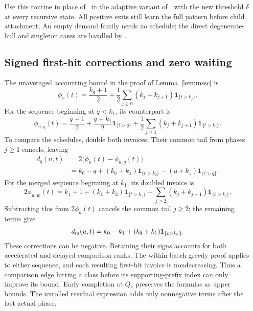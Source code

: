 Use this routine in place of \BatchOrders\ in the adaptive variant
of \ExpectedTree, with the new threshold $\delta$ at every recursive
state. All positive exits still learn the full pattern before child
attachment. An empty demand family needs no schedule; the direct
degenerate-hull and singleton cases are handled by \ExpectedTree.

\subsection{Signed first-hit corrections and zero waiting}

The unaveraged accounting bound in the proof of
Lemma~\ref{lem:mssc} is
\[
 \phi_u(t)=\frac{k_0+1}{2}
  +\frac12\sum_{j\ge0}(k_j+k_{j+1})\mathbf1_{\{t>k_j\}}.
\]
For the sequence beginning at $q<k_1$, its counterpart is
\[
 \phi_{u,q}(t)=\frac{q+1}{2}
  +\frac{q+k_1}{2}\mathbf1_{\{t>q\}}
  +\frac12\sum_{j\ge1}(k_j+k_{j+1})\mathbf1_{\{t>k_j\}}.
\]
To compare the schedules, double both invoices. Their common tail
from phases $j\ge1$ cancels, leaving
\begin{equation}\label{eq:first-phase-correction}
 \begin{aligned}
 d_q(u,t)&=2\bigl(\phi_u(t)-\phi_{u,q}(t)\bigr)\\
 &=k_0-q+(k_0+k_1)\mathbf1_{\{t>k_0\}}
              -(q+k_1)\mathbf1_{\{t>q\}}.
 \end{aligned}
\end{equation}
For the merged sequence beginning at $k_1$, its doubled invoice is
\[
 2\phi_{u,\mathrm m}(t)=k_1+1+(k_1+k_2)\mathbf1_{\{t>k_1\}}
       +\sum_{j\ge2}(k_j+k_{j+1})\mathbf1_{\{t>k_j\}}.
\]
Subtracting this from $2\phi_u(t)$ cancels the common tail
$j\ge2$; the remaining terms give
\begin{equation}\label{eq:merged-phase-correction}
 d_{\rm m}(u,t)=k_0-k_1+(k_0+k_1)\mathbf1_{\{t>k_0\}}.
\end{equation}
These corrections can be negative. Retaining their signs accounts
for both accelerated and delayed comparison ranks. The within-batch
greedy proof applies to either sequence, and each resulting first-hit
invoice is nondecreasing. Thus a comparison edge hitting a class
before its supporting-prefix index can only improve its bound.
Early completion at $Q_*$ preserves the formulas as upper bounds. The
unrolled residual expression adds only nonnegative terms after the last
actual phase.

